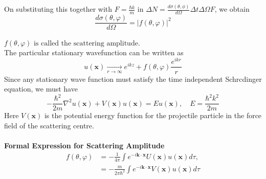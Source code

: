 On substituting this together with $F=\frac{\hbar k}{m}$ in $ \Delta N=\frac{d\sigma(\theta,\phi)}{d\Omega}\Delta t \Delta \Omega F$, we obtain\\
$$\frac{d \sigma(\theta, \varphi)}{d \Omega}=|f(\theta, \varphi)|^{2}$$\\
\textbf{$f(\theta, \varphi) \text { is called the scattering amplitude. }$}\\
The particular stationary  wavefunction can be written as \\
$$u(\mathbf{x}) \underset{r \rightarrow \infty}{\longrightarrow} e^{i k z}+f(\theta, \varphi) \frac{e^{i k r}}{r}$$
Since any stationary wave function must satisfy the time independent Schrcdinger equation, we must have
$$
-\frac{\hbar^{2}}{2 m} \nabla^{2} u(\mathbf{x})+V(\mathbf{x}) u(\mathbf{x})=E u(\mathbf{x}), \quad E=\frac{\hbar^{2} k^{2}}{2 m}
$$
Here $V(\mathbf{x})$ is the potential energy function for the projectile particle in the force field of the scattering centre. \\\\
\textbf{Formal Expression for Scattering Amplitude}
$$\begin{aligned}
	f(\theta, \varphi) &=-\frac{1}{4 \pi} \int e^{-i \mathbf{k} \cdot \mathbf{x}} U(\mathbf{x}) u(\mathbf{x}) d \tau, \\
	&=-\frac{m}{2 \pi \hbar^{2}} \int e^{-i \mathbf{k} \cdot \mathbf{x}} V(\mathbf{x}) u(\mathbf{x}) d \tau
\end{aligned}$$
